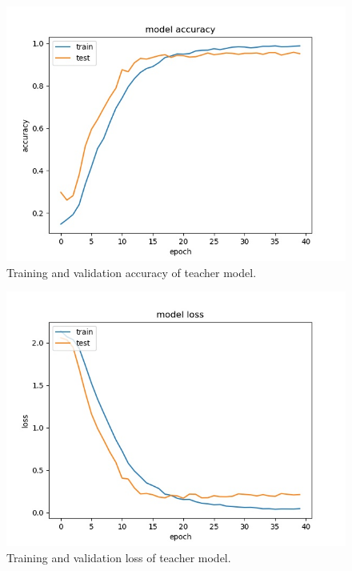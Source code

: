 \documentclass[extendedabs]{bmvc2k}
\begin{document}
\begin{figure}[t]
\includegraphics[width=\linewidth]{images/accuracy_teacher.jpg}
\caption{
Training and validation accuracy of teacher model.}
\label{fig:accteacher}
\vspace{-2mm}
\end{figure}

\begin{figure}[t]
\includegraphics[width=\linewidth]{images/loss_teacher.jpg}
\caption{
Training and validation loss of teacher model.}
\label{fig:lossteacher}
\vspace{-2mm}
\end{figure}
\end{document}
